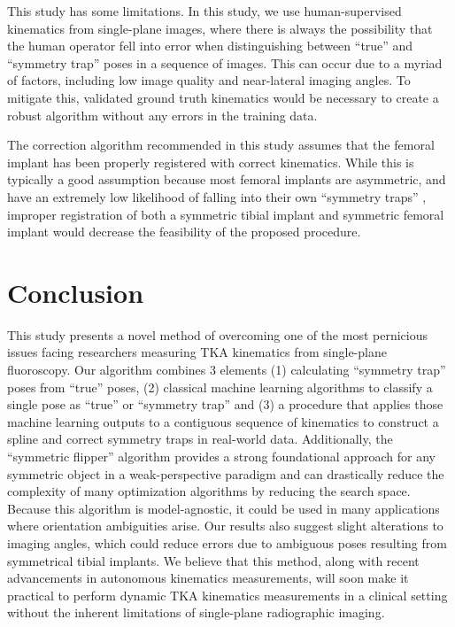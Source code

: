 This study has some limitations. In this study, we use human-supervised kinematics from single-plane images, where there is always the possibility that the human operator fell into error when distinguishing between “true” and “symmetry trap” poses in a sequence of images. This can occur due to a myriad of factors, including low image quality and near-lateral imaging angles. To mitigate this, validated ground truth kinematics would be necessary to create a robust algorithm without any errors in the training data.

The correction algorithm recommended in this study assumes that the femoral implant has been properly registered with correct kinematics. While this is typically a good assumption because most femoral implants are asymmetric, and have an extremely low likelihood of falling into their own “symmetry traps” \cite{jensenJointTrackMachine2023}, improper registration of both a symmetric tibial implant and symmetric femoral implant would decrease the feasibility of the proposed procedure.

\section{Conclusion}
This study presents a novel method of overcoming one of the most pernicious issues facing researchers measuring TKA kinematics from single-plane fluoroscopy.
Our algorithm combines 3 elements (1) calculating “symmetry trap” poses from “true” poses, (2) classical machine learning algorithms to classify a single pose as “true” or “symmetry trap” and (3) a procedure that applies those machine learning outputs to a contiguous sequence of kinematics to construct a spline and correct symmetry traps in real-world data.
Additionally, the “symmetric flipper” algorithm provides a strong foundational approach for any symmetric object in a weak-perspective paradigm and can drastically reduce the complexity of many optimization algorithms by reducing the search space.
Because this algorithm is model-agnostic, it could be used in many applications where orientation ambiguities arise.
Our results also suggest slight alterations to imaging angles, which could reduce errors due to ambiguous poses resulting from symmetrical tibial implants.
We believe that this method, along with recent advancements in autonomous kinematics measurements, will soon make it practical to perform dynamic TKA kinematics measurements in a clinical setting without the inherent limitations of single-plane radiographic imaging.


